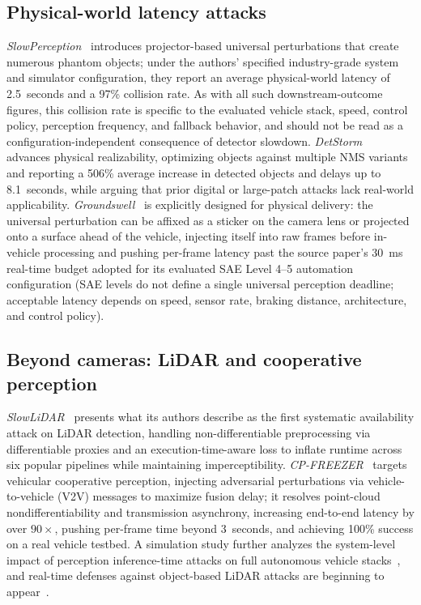 \documentclass[acmsmall,screen,review,nonacm]{acmart}
\begin{document}
\subsection{Physical-world latency attacks}
\emph{SlowPerception}~\cite{ma2024slowperception} introduces projector-based universal perturbations that create numerous phantom objects; under the authors' specified industry-grade system and simulator configuration, they report an average physical-world latency of 2.5~seconds and a 97\% collision rate. As with all such downstream-outcome figures, this collision rate is specific to the evaluated vehicle stack, speed, control policy, perception frequency, and fallback behavior, and should not be read as a configuration-independent consequence of detector slowdown. \emph{DetStorm}~\cite{muller2025detstorm} advances physical realizability, optimizing objects against multiple NMS variants and reporting a 506\% average increase in detected objects and delays up to 8.1~seconds, while arguing that prior digital or large-patch attacks lack real-world applicability. \emph{Groundswell}~\cite{xia2026groundswell} is explicitly designed for physical delivery: the universal perturbation can be affixed as a sticker on the camera lens or projected onto a surface ahead of the vehicle, injecting itself into raw frames before in-vehicle processing and pushing per-frame latency past the source paper's 30~ms real-time budget adopted for its evaluated SAE Level 4--5 automation configuration (SAE levels do not define a single universal perception deadline; acceptable latency depends on speed, sensor rate, braking distance, architecture, and control policy).

\subsection{Beyond cameras: LiDAR and cooperative perception}
\emph{SlowLiDAR}~\cite{liu2023slowlidar} presents what its authors describe as the first systematic availability attack on LiDAR detection, handling non-differentiable preprocessing via differentiable proxies and an execution-time-aware loss to inflate runtime across six popular pipelines while maintaining imperceptibility. \emph{CP-FREEZER}~\cite{wang2026cpfreezer} targets vehicular cooperative perception, injecting adversarial perturbations via vehicle-to-vehicle (V2V) messages to maximize fusion delay; it resolves point-cloud nondifferentiability and transmission asynchrony, increasing end-to-end latency by over $90\times$, pushing per-frame time beyond 3~seconds, and achieving 100\% success on a real vehicle testbed. A simulation study further analyzes the system-level impact of perception inference-time attacks on full autonomous vehicle stacks~\cite{chen2025impact}, and real-time defenses against object-based LiDAR attacks are beginning to appear~\cite{zhang2025detstormlidar}.
\end{document}
